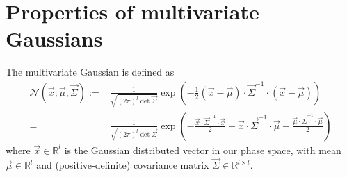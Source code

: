 \documentclass[11pt,twoside]{report}
\begin{document}
\section{Properties of multivariate Gaussians}
\label{sec:gaussian-properties}


The multivariate Gaussian is defined as
\begin{equation}
  \begin{split}
    \mathcal{N}(\vec{x}; \vec{\mu}, \vec{\Sigma})
    :=&
    \frac{1}{\sqrt{ (2\pi)^l \det{\vec{\Sigma}} }}
    \exp{\left(
      - \frac{1}{2} (\vec{x} - \vec{\mu}) \cdot \vec{\Sigma}^{-1} \cdot (\vec{x} - \vec{\mu})
      \right)}
    \\
    =&
    \frac{1}{\sqrt{ (2\pi)^l \det{\vec{\Sigma}} }}
    \exp{\left(
      - \frac{\vec{x} \cdot \vec{\Sigma}^{-1} \cdot \vec{x}}{2}
      + \vec{x} \cdot \vec{\Sigma}^{-1} \cdot \vec{\mu}
      - \frac{\vec{\mu} \cdot \vec{\Sigma}^{-1} \cdot \vec{\mu}}{2}
      \right)}
  \end{split}
\end{equation}
where $\vec{x} \in \mathbb{R}^l$ is the Gaussian distributed vector in our phase space, with mean $\vec{\mu} \in \mathbb{R}^l$ and (positive-definite) covariance matrix $\vec{\Sigma} \in \mathbb{R}^{l \times l}$.
\end{document}
